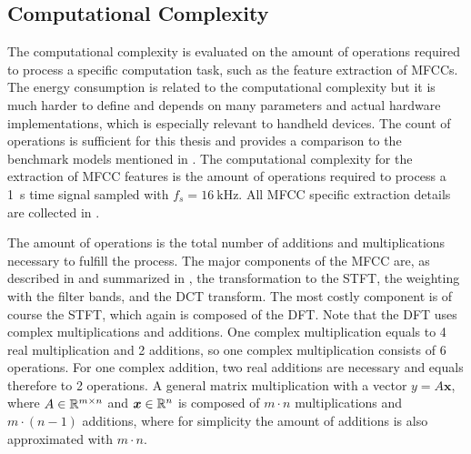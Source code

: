 
\subsection{Computational Complexity}\label{sec:signal_mfcc_complexity}
The computational complexity is evaluated on the amount of operations required to process a specific computation task, such as the feature extraction of MFCCs.
The energy consumption is related to the computational complexity but it is much harder to define and depends on many parameters and actual hardware implementations, which is especially relevant to handheld devices.
The count of operations is sufficient for this thesis and provides a comparison to the benchmark models mentioned in .
The computational complexity for the extraction of MFCC features is the amount of operations required to process a \SI{1}{\second} time signal sampled with $f_s = \SI{16}{\kilo\hertz}$.
All MFCC specific extraction details are collected in .

The amount of operations is the total number of additions and multiplications necessary to fulfill the process.
The major components of the MFCC are, as described in  and summarized in , the transformation to the STFT, the weighting with the filter bands, and the DCT transform.
The most costly component is of course the STFT, which again is composed of the DFT.
Note that the DFT uses complex multiplications and additions.
One complex multiplication equals to 4 real multiplication and 2 additions, so one complex multiplication consists of 6 operations.
For one complex addition, two real additions are necessary and equals therefore to 2 operations.
A general matrix multiplication with a vector $y = A \bm{x}$, where $A \in \mathbb{R}^{m \times n}$ and $\bm{x} \in \mathbb{R}^n$ is composed of $m \cdot n$ multiplications and $m \cdot (n - 1)$ additions, where for simplicity the amount of additions is also approximated with $m \cdot n$.

